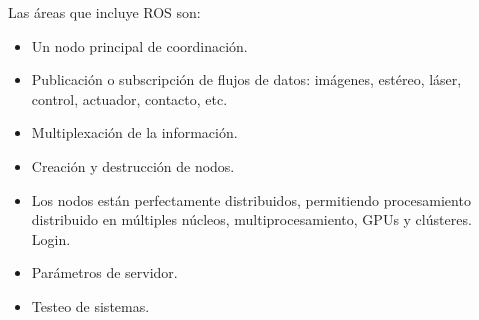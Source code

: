 	Las áreas que incluye ROS son:
	\begin{itemize}
		\item Un nodo principal de coordinación.
		\item Publicación o subscripción de flujos de datos: imágenes, estéreo, láser, control, actuador, contacto, etc.
		\item Multiplexación de la información.
		\item Creación y destrucción de nodos.
		\item Los nodos están perfectamente distribuidos, permitiendo procesamiento distribuido en múltiples núcleos, multiprocesamiento, GPUs y clústeres.
		Login.
		\item Parámetros de servidor.
		\item Testeo de sistemas.
	\end{itemize}